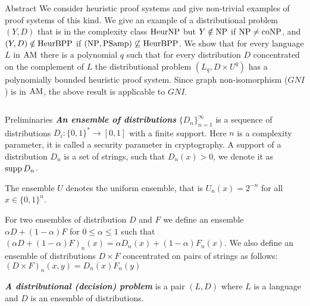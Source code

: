 \begin{frame}{}

    \begin{block}{Abstract} \justifying
        We consider heuristic proof
		systems and give non-trivial examples of proof
        systems of this kind. We give an example of a distributional problem $(Y,D)$
        that is in the complexity class $\rm HeurNP$ but $Y\notin \rm NP$ if $\rm
        NP \neq coNP$, and $(Y, D)\notin \rm HeurBPP$ if $(\rm NP, PSamp) \not
        \subseteq HeurBPP$.   We show that for every
        language $L$ in $\rm AM$ there is a polynomial $q$ such that for every
        distribution $D$ concentrated on the complement of $L$ the distributional
        problem $(L_q, D \times U^q)$ has a polynomially bounded heuristic proof
        system. Since graph non-isomorphism ($GNI$) is in $\rm AM$, the above result
        is applicable to $GNI$.
    \end{block}

    
\begin{columns}[t]
	\begin{column}{0.32\linewidth}

            
		\begin{block}{Preliminaries}
                {\bf \em An ensemble of distributions} $\{D_n\}_{n=1}^{\infty}$ is a
                sequence of distributions $D_i : \{0,1\}^* \to [0, 1]$ with a finite
                support. Here $n$ is a complexity parameter, it is called a security
                parameter in cryptography. A support of a distribution $D_n$ is a set
                of strings, such that $D_n(x) > 0$, we denote it as $\operatorname*{supp} D_n$.

                The ensemble $U$ denotes the uniform ensemble, that is $U_n(x) =
                2^{-n}$ for all $x\in \{0,1\}^n$.

				For two ensembles of distribution $D$ and $F$ we define an ensemble
                $\alpha D + (1 - \alpha) F$ for $0 \le \alpha \le 1$ such that
                $(\alpha D + (1 - \alpha) F)_n(x) = \alpha D_n(x) + (1 - \alpha)
                F_n(x)$. We also define an ensemble of distributions $D \times F$
                concentrated on pairs of strings as follows: $(D \times F)_n(x, y) =
                D_n(x) F_n(y)$

                {\bf \em A distributional (decision) problem} is a pair $(L, D)$
                where $L$ is a language and $D$ is an ensemble of distributions.
		\end{block}


\end{column}
\end{columns}
\end{frame}
